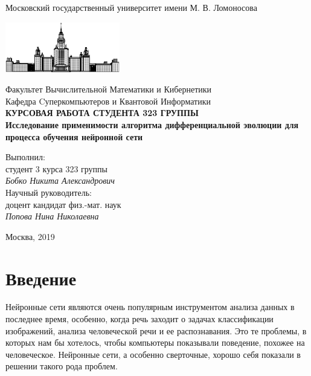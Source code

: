 \documentclass[12pt]{article}
\begin{document}
\begin{titlepage}
\begin{center}
    Московский государственный университет имени М. В. Ломоносова

    \bigskip
    \includegraphics[width=50mm]{msu.eps}

    \bigskip
    Факультет Вычислительной Математики и Кибернетики\\
    Кафедра Cуперкомпьютеров и Квантовой Информатики\\[10mm]

    \textsf{\large\bfseries
        КУРСОВАЯ РАБОТА СТУДЕНТА 323 ГРУППЫ\\[10mm]
        Исследование применимости алгоритма дифференциальной эволюции для процесса обучения нейронной сети
    }\\[10mm]

    \begin{flushright}
        \parbox{0.5\textwidth}{
            Выполнил:\\
            студент 3 курса 323 группы\\
            \emph{Бобко Никита Александрович}\\[5mm]
            Научный руководитель:\\
            доцент  кандидат физ.-мат. наук\\
            \emph{Попова Нина Николаевна}
        }
    \end{flushright}

    \vspace{\fill}
    Москва, 2019
\end{center}
\end{titlepage}

\newpage
\tableofcontents
\newpage

\section{Введение}
    Нейронные сети являются очень популярным инструментом анализа данных в последнее время, особенно, когда речь заходит о задачах классификации изображений, анализа человеческой речи и ее распознавания. Это те проблемы, в которых нам бы хотелось, чтобы компьютеры показывали поведение, похожее на человеческое. Нейронные сети, а особенно сверточные, хорошо себя показали в решении такого рода проблем. \\
\end{document}
